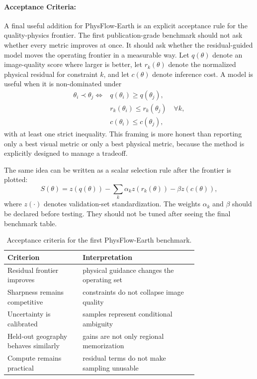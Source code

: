 \documentclass{article}
\begin{document}
\paragraph{Acceptance Criteria:}

A final useful addition for PhysFlow-Earth is an explicit acceptance rule for the quality-physics frontier. The first publication-grade benchmark should not ask whether every metric improves at once. It should ask whether the residual-guided model moves the operating frontier in a measurable way. Let $q(\theta)$ denote an image-quality score where larger is better, let $r_k(\theta)$ denote the normalized physical residual for constraint $k$, and let $c(\theta)$ denote inference cost. A model is useful when it is non-dominated under
\begin{equation}
\begin{aligned}
\theta_i \prec \theta_j\Longleftrightarrow{}& q(\theta_i) \ge q(\theta_j),\\
& r_k(\theta_i) \le r_k(\theta_j)\quad \forall k,\\
& c(\theta_i) \le c(\theta_j),
\end{aligned}
\end{equation}
with at least one strict inequality. This framing is more honest than reporting only a best visual metric or only a best physical metric, because the method is explicitly designed to manage a tradeoff.

The same idea can be written as a scalar selection rule after the frontier is plotted:
\begin{equation}
  S(\theta) =
  z(q(\theta))
  - \sum_k \alpha_k z(r_k(\theta))
  - \beta z(c(\theta)),
\end{equation}
where $z(\cdot)$ denotes validation-set standardization. The weights $\alpha_k$ and $\beta$ should be declared before testing. They should not be tuned after seeing the final benchmark table.

\begin{table}[t]
\centering
\caption{Acceptance criteria for the first PhysFlow-Earth benchmark.}
\begin{tabular}{@{}p{0.30\linewidth}p{0.46\linewidth}@{}}
\toprule
\textbf{Criterion} & \textbf{Interpretation}\\
\midrule
Residual frontier improves & physical guidance changes the operating set\\
Sharpness remains competitive & constraints do not collapse image quality\\
Uncertainty is calibrated & samples represent conditional ambiguity\\
Held-out geography behaves similarly & gains are not only regional memorization\\
Compute remains practical & residual terms do not make sampling unusable\\
\bottomrule
\end{tabular}
\end{table}
\end{document}
